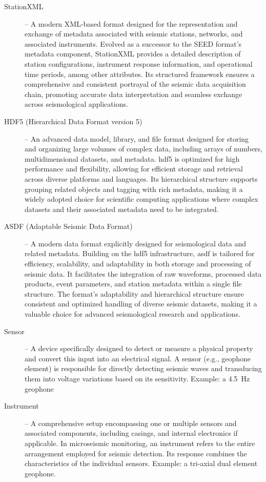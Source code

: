 \begin{description}
    \item[StationXML \citep{stationxml}] -- A modern XML-based format designed for the representation and exchange of metadata associated with seismic stations, networks, and associated instruments. Evolved as a successor to the SEED format's metadata component, StationXML provides a detailed description of station configurations, instrument response information, and operational time periods, among other attributes. Its structured framework ensures a comprehensive and consistent portrayal of the seismic data acquisition chain, promoting accurate data interpretation and seamless exchange across seismological applications.
    \item[HDF5 (Hierarchical Data Format version 5)] -- An advanced data model, library, and file format designed for storing and organizing large volumes of complex data, including arrays of numbers, multidimensional datasets, and metadata. \gls{hdf5} is optimized for high performance and flexibility, allowing for efficient storage and retrieval across diverse platforms and languages. Its hierarchical structure supports grouping related objects and tagging with rich metadata, making it a widely adopted choice for scientific computing applications where complex datasets and their associated metadata need to be integrated.
    \item[ASDF (Adaptable Seismic Data Format)] -- A modern data format explicitly designed for seismological data and related metadata. Building on the \gls{hdf5} infrastructure, \gls{asdf} is tailored for efficiency, scalability, and adaptability in both storage and processing of seismic data. It facilitates the integration of raw waveforms, processed data products, event parameters, and station metadata within a single file structure. The format's adaptability and hierarchical structure ensure consistent and optimized handling of diverse seismic datasets, making it a valuable choice for advanced seismological research and applications.
    \item[Sensor] -- A device specifically designed to detect or measure a physical property and convert this input into an electrical signal. A sensor (e.g., geophone element) is responsible for directly detecting seismic waves and transducing them into voltage variations based on its sensitivity. Example: a \SI{4.5}{\hertz} geophone
    \item[Instrument] -- A comprehensive setup encompassing one or multiple sensors and associated components, including casings, and internal electronics if applicable. In microseismic monitoring, an instrument refers to the entire arrangement employed for seismic detection. Its response combines the characteristics of the individual sensors. Example: a tri-axial dual element geophone.
    
\end{description}